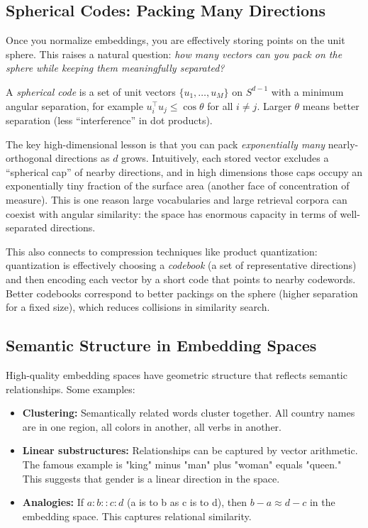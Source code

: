 \vspace{1.5em}

\subsection{Spherical Codes: Packing Many Directions}

Once you normalize embeddings, you are effectively storing points on the unit sphere. This raises a natural question: \emph{how many vectors can you pack on the sphere while keeping them meaningfully separated?}

A \emph{spherical code} is a set of unit vectors $\{u_1,\ldots,u_M\}$ on $S^{d-1}$ with a minimum angular separation, for example $u_i^\top u_j \le \cos\theta$ for all $i\neq j$. Larger $\theta$ means better separation (less ``interference'' in dot products).

The key high-dimensional lesson is that you can pack \emph{exponentially many} nearly-orthogonal directions as $d$ grows. Intuitively, each stored vector excludes a ``spherical cap'' of nearby directions, and in high dimensions those caps occupy an exponentially tiny fraction of the surface area (another face of concentration of measure). This is one reason large vocabularies and large retrieval corpora can coexist with angular similarity: the space has enormous capacity in terms of well-separated directions.

This also connects to compression techniques like product quantization: quantization is effectively choosing a \emph{codebook} (a set of representative directions) and then encoding each vector by a short code that points to nearby codewords. Better codebooks correspond to better packings on the sphere (higher separation for a fixed size), which reduces collisions in similarity search.

\vspace{1.5em}

\subsection{Semantic Structure in Embedding Spaces}

High-quality embedding spaces have geometric structure that reflects semantic relationships. Some examples:

\begin{itemize}
\item \textbf{Clustering:} Semantically related words cluster together. All country names are in one region, all colors in another, all verbs in another.

\item \textbf{Linear substructures:} Relationships can be captured by vector arithmetic. The famous example is "king" minus "man" plus "woman" equals "queen." This suggests that gender is a linear direction in the space.

\item \textbf{Analogies:} If $a : b :: c : d$ (a is to b as c is to d), then $b - a \approx d - c$ in the embedding space. This captures relational similarity.
\end{itemize}

